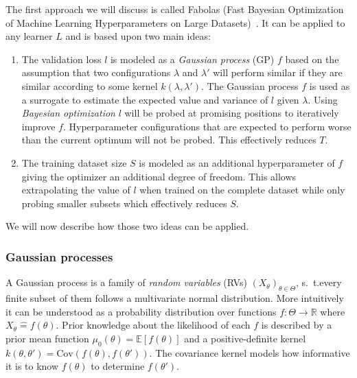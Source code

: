 The first approach we will discuss is called Fabolas (Fast Bayesian Optimization of Machine Learning Hyperparameters on Large Datasets)~\cite{Klein2017}.
It can be applied to any learner \(L\) and is based upon two main ideas:
\begin{enumerate}
	\item The validation loss \(l\) is modeled as a \textit{Gaussian process} (GP) \(f\) based on the assumption that two configurations \(\lambda\) and \(\lambda'\) will perform similar if they are similar according to some kernel \(k(\lambda, \lambda')\).
		The Gaussian process \(f\) is used as a surrogate to estimate the expected value and variance of \(l\) given \(\lambda\).
		Using \textit{Bayesian optimization} \(l\) will be probed at promising positions to iteratively improve \(f\).
		Hyperparameter configurations that are expected to perform worse than the current optimum will not be probed.
		This effectively reduces \(T\).
	\item The training dataset size \(S\) is modeled as an additional hyperparameter of \(f\) giving the optimizer an additional degree of freedom.
		This allows extrapolating the value of \(l\) when trained on the complete dataset while only probing smaller subsets
		which effectively reduces \(S\).
\end{enumerate}
We will now describe how those two ideas can be applied.

\subsubsection{Gaussian processes}%
\label{sec:hyperparams:fabolas:gaussian}

A Gaussian process is a family of \textit{random variables} (RVs) \({(X_\theta)}_{\theta \in \Theta}\), s.~t.\@ every finite subset of them follows a multivariate normal distribution.
More intuitively it can be understood as a probability distribution over functions \(f: \Theta \to \mathbb{R}\) where \(X_\theta \mathrel{\widehat{=}} f(\theta)\).
Prior knowledge about the likelihood of each \(f\) is described by a prior mean function \(\mu_0(\theta) = \mathbb{E}[f(\theta)]\) and a positive-definite kernel \(k(\theta, \theta') = \mathrm{Cov}(f(\theta), f(\theta'))\).
The covariance kernel models how informative it is to know \(f(\theta)\) to determine \(f(\theta')\).

